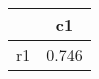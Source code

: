 \begin{table}[htbp]
\begin{tabular}{lc} \hline \hline
 & c1  \\  \hline 
r1 &     0.746 \\  
\hline \hline \end{tabular}
\end{table}
